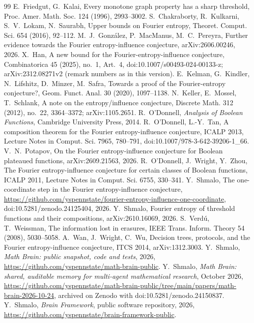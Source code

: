 \documentclass[11pt]{amsart}
\theoremstyle{remark}
\begin{document}
\begin{thebibliography}{99}
 E.~Friedgut, G.~Kalai, Every monotone graph property has a sharp threshold, Proc. Amer. Math. Soc.
124 (1996), 2993--3002.
 S.~Chakraborty, R.~Kulkarni, S.~V.~Lokam, N.~Saurabh, Upper bounds on Fourier entropy, Theoret.
Comput. Sci. 654 (2016), 92--112.
 M.~J.~Gonz\'alez, P.~MacManus, M.~C.~Pereyra, Further evidence towards the Fourier
entropy-influence conjecture, arXiv:2606.00246, 2026.
 X.~Han, A new bound for the Fourier-entropy-influence conjecture, Combinatorica 45 (2025), no.~1,
Art.~4, doi:10.1007/s00493-024-00133-z; arXiv:2312.08271v2 (remark numbers as in this version).
 E.~Kelman, G.~Kindler, N.~Lifshitz, D.~Minzer, M.~Safra, Towards a proof of the
Fourier-entropy conjecture?, Geom. Funct. Anal. 30 (2020), 1097--1138.
 N.~Keller, E.~Mossel, T.~Schlank, A note on the entropy/influence conjecture, Discrete Math. 312
(2012), no.~22, 3364--3372; arXiv:1105.2651.
 R.~O'Donnell, \emph{Analysis of Boolean Functions}, Cambridge University Press, 2014.
 R.~O'Donnell, L.-Y.~Tan, A composition theorem for the Fourier entropy-influence conjecture, ICALP 2013,
Lecture Notes in Comput. Sci. 7965, 780--791, doi:10.1007/978-3-642-39206-1\_66.
 V.~N.~Potapov, On the Fourier entropy-influence conjecture for Boolean plateaued functions,
arXiv:2609.21563, 2026.
 R.~O'Donnell, J.~Wright, Y.~Zhou, The Fourier entropy-influence conjecture for certain classes of
Boolean functions, ICALP 2011, Lecture Notes in Comput. Sci. 6755, 330--341.
 Y.~Shmalo, The one-coordinate step in the Fourier entropy-influence conjecture,
\url{https://github.com/yspennstate/fourier-entropy-influence-one-coordinate}, doi:10.5281/zenodo.24125404, 2026.
 Y.~Shmalo, Fourier entropy of threshold functions and their compositions, arXiv:2610.16069, 2026.
 S.~Verd\'u, T.~Weissman, The information lost in erasures, IEEE Trans. Inform. Theory 54 (2008),
5030--5058.
 A.~Wan, J.~Wright, C.~Wu, Decision trees, protocols, and the Fourier entropy-influence conjecture, ITCS 2014,
arXiv:1312.3003.
 Y.~Shmalo, \emph{Math Brain: public snapshot, code and tests}, 2026,
\url{https://github.com/yspennstate/math-brain-public}.
 Y.~Shmalo, \emph{Math Brain: shared, auditable memory for multi-agent mathematical research},
October 2026, \url{https://github.com/yspennstate/math-brain-public/tree/main/papers/math-brain-2026-10-24}, archived on Zenodo with doi:10.5281/zenodo.24150837.
 Y.~Shmalo, \emph{Brain Framework}, public software repository, 2026,
\url{https://github.com/yspennstate/brain-framework-public}.
\end{thebibliography}
\end{document}
